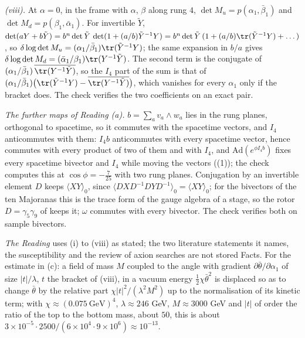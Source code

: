 \emph{(viii).} At $\alpha = 0$, in the frame with $\alpha$, $\beta$ along rung $4$, $\det M_{u} = p(\alpha_{1}, \bar\beta_{1})$ and $\det M_{d} = p(\beta_{1}, \bar\alpha_{1})$. For invertible $\tilde{Y}$, $\det(a Y + b\tilde{Y}) = b^{n}\det\tilde{Y}\,\det(1 + (a/b)\tilde{Y}^{-1}Y) = b^{n}\det\tilde{Y}\,(1 + (a/b)\tr(\tilde{Y}^{-1}Y) + \dots)$, so $\delta\log\det M_{u} = (\alpha_{1}/\bar\beta_{1})\tr(\tilde{Y}^{-1}Y)$; the same expansion in $b/a$ gives $\delta\log\det M_{d} = (\bar\alpha_{1}/\beta_{1})\tr(Y^{-1}\tilde{Y})$. The second term is the conjugate of $(\alpha_{1}/\bar\beta_{1})\,\overline{\tr(Y^{-1}\tilde{Y})}$, so the $I_{4}$ part of the sum is that of $(\alpha_{1}/\bar\beta_{1})\bigl(\tr(\tilde{Y}^{-1}Y) - \overline{\tr(Y^{-1}\tilde{Y})}\bigr)$, which vanishes for every $\alpha_{1}$ only if the bracket does. The check verifies the two coefficients on an exact pair.

\emph{The further maps of Reading (a).} $b = \sum_{a}v_{a} \wedge w_{a}$ lies in the rung planes, orthogonal to spacetime, so it commutes with the spacetime vectors, and $I_{4}$ anticommutes with them: $I_{4}b$ anticommutes with every spacetime vector, hence commutes with every product of two of them and with $I_{4}$, and $\mathrm{Ad}(e^{\phi I_{4}b})$ fixes every spacetime bivector and $I_{4}$ while moving the vectors ((1)); the check computes this at $\cos\phi = -\tfrac{7}{25}$ with two rung planes. Conjugation by an invertible element $D$ keeps $\langle XY\rangle_{0}$, since $\langle DXD^{-1}DYD^{-1}\rangle_{0} = \langle XY\rangle_{0}$; for the bivectors of the ten Majoranas this is the trace form of the gauge algebra of a stage, so the rotor $D = \gamma_{5}\gamma_{9}$ of  keeps it; $\omega$ commutes with every bivector. The check verifies both on sample bivectors.

\emph{The Reading} uses (i) to (viii) as stated; the two literature statements it names, the susceptibility and the review of axion searches are not stored Facts. For the estimate in (c): a field of mass $M$ coupled to the angle with gradient $\partial\bar\theta/\partial\alpha_{1}$ of size $|t|/\lambda$, $t$ the bracket of (viii), in a vacuum energy $\tfrac12\chi\bar\theta^{2}$ is displaced so as to change $\bar\theta$ by the relative part $\chi|t|^{2}/(\lambda^{2}M^{2})$ up to the normalisation of its kinetic term; with $\chi \approx (0.075\ \mathrm{GeV})^{4}$, $\lambda \approx 246$ GeV, $M \approx 3000$ GeV and $|t|$ of order the ratio of the top to the bottom mass, about $50$, this is about $3 \times 10^{-5} \cdot 2500/(6 \times 10^{4} \cdot 9 \times 10^{6}) \approx 10^{-13}$.
